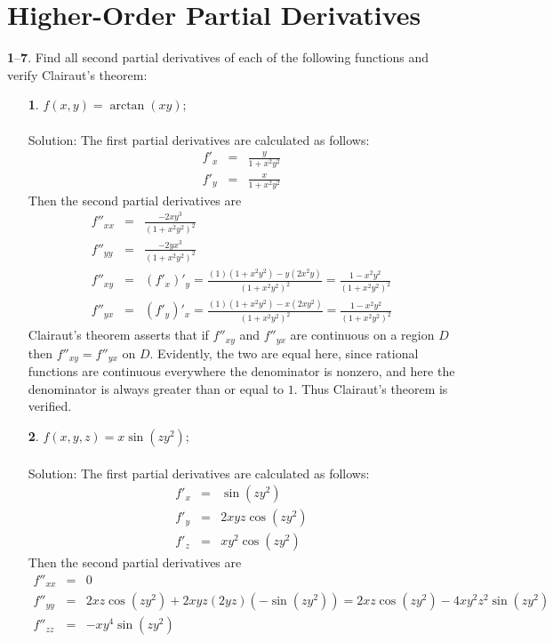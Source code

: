 \documentclass[12pt]{amsbook}
\begin{document}
\section{Higher-Order Partial Derivatives}
\noindent
{\small {\bf 1}--{\bf 7}}. Find all second partial derivatives of each of the following functions
and verify Clairaut’s theorem:
\begin{enumerate}
\item[{\small\bf 1}.] $f(x,y)=\arctan(xy)$;
\\
\\
{\sc Solution}: The first partial derivatives are calculated as follows:
\begin{eqnarray*}
f'_x&=&\frac{y}{1+x^2y^2} \\
f'_y&=&\frac{x}{1+x^2y^2}
\end{eqnarray*}
Then the second partial derivatives are
\begin{eqnarray*}
f''_{xx}&=& \frac{-2xy^3}{(1+x^2y^2)^2} \\
f''_{yy}&=& \frac{-2yx^3}{(1+x^2y^2)^2} \\
f''_{xy}&=& (f'_x)'_y= \frac{(1)(1+x^2y^2)-y(2x^2y)}{(1+x^2y^2)^2}=\frac{1-x^2y^2}{(1+x^2y^2)^2}\\
f''_{yx}&=& (f'_y)'_x= \frac{(1)(1+x^2y^2)-x(2xy^2)}{(1+x^2y^2)^2}=\frac{1-x^2y^2}{(1+x^2y^2)^2}
\end{eqnarray*}
Clairaut's theorem asserts that if $f''_{xy}$ and $f''_{yx}$ are continuous on a region $D$ then $f''_{xy}=f''_{yx}$ on $D$. Evidently, the two are equal here, since rational functions are continuous everywhere the denominator is nonzero, and here the denominator is always greater than or equal to $1$. Thus Clairaut's theorem is verified.
\\
\item[{\small\bf 2}.] $f(x,y,z)=x\sin(zy^2)$;
\\
\\
{\sc Solution}: The first partial derivatives are calculated as follows:
\begin{eqnarray*}
f'_x&=&\sin(zy^2) \\
f'_y&=&2xyz\cos(zy^2) \\
f'_z&=&xy^2\cos(zy^2)
\end{eqnarray*}
Then the second partial derivatives are
\begin{eqnarray*}
f''_{xx}&=& 0 \\
f''_{yy}&=& 2xz\cos(zy^2)+2xyz(2yz)(-\sin(zy^2))=2xz\cos(zy^2)-4xy^2z^2\sin(zy^2) \\
f''_{zz}&=& -xy^4\sin(zy^2) \\

\end{eqnarray*}
\end{enumerate}
\end{document}
